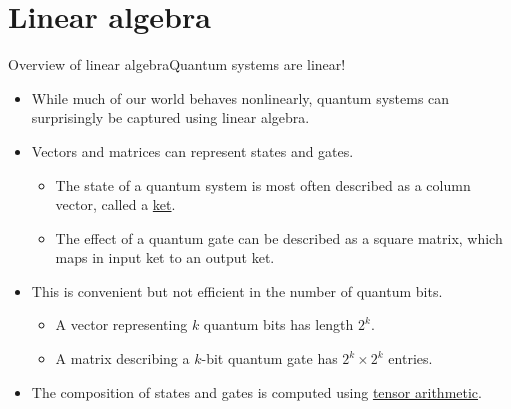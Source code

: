 \section{Linear algebra}

\begin{frame}{Overview of linear algebra}{Quantum systems are linear!}
\begin{itemize}
    \item While much of our world behaves nonlinearly, quantum systems can surprisingly be captured using linear algebra.
    \item Vectors and matrices can represent states and gates.  
    \begin{itemize}
        \item The state of a quantum system is most often described as a column vector, called a \href{https://en.wikipedia.org/wiki/Bra-ket_notation}{ket}.
         \item The effect of a quantum gate can be described as a square matrix, which maps in input ket to an output ket.
    \end{itemize}
    \item This is convenient but not efficient in the number of quantum bits.
    \begin{itemize}
        \item A vector representing $k$ quantum bits has length $2^{k}$.
        \item A matrix describing a $k$-bit quantum gate has $2^{k} \times 2^{k}$ entries.
    \end{itemize}
    \item The composition of states and gates is computed using \href{https://en.wikipedia.org/wiki/Tensor}{tensor arithmetic}.
\end{itemize}
    
\end{frame}


